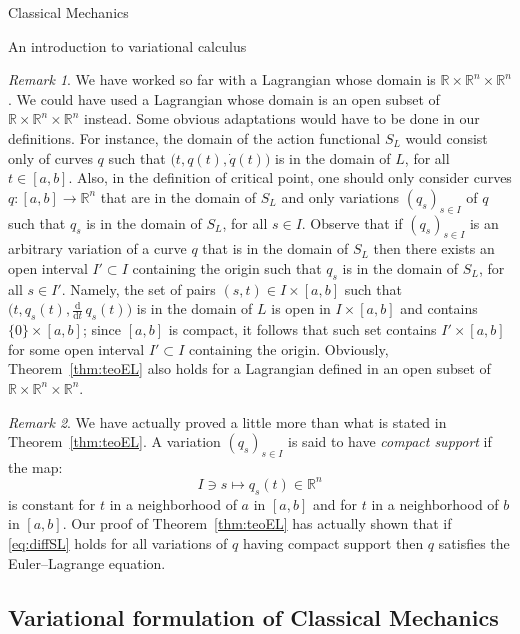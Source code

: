 \documentclass[oneside,a4paper,11pt]{amsbook}
\newcommand{\R}{\mathds R}
\newcommand{\dd}{\mathrm d}
\theoremstyle{remark}\newtheorem{exercise}{Exercise}[chapter]
\theoremstyle{plain}\newtheorem{teo}{Theorem}[section]
\theoremstyle{plain}\newtheorem{lem}[teo]{Lemma}
\theoremstyle{plain}\newtheorem{prop}[teo]{Proposition}
\theoremstyle{plain}\newtheorem{cor}[teo]{Corollary}
\theoremstyle{definition}\newtheorem{defin}[teo]{Definition}
\theoremstyle{remark}\newtheorem{rem}[teo]{Remark}
\theoremstyle{definition}\newtheorem{notation}[teo]{Notation}
\theoremstyle{definition}\newtheorem{convention}[teo]{Convention}
\theoremstyle{definition}\newtheorem{example}[teo]{Example}
\numberwithin{section}{chapter}
\numberwithin{equation}{section}
\begin{document}
\begin{chapter}{Classical Mechanics}
\begin{section}{An introduction to variational calculus}
\begin{rem}\label{thm:remdomLopen}
We have worked so far with a Lagrangian whose domain is $\R\times\R^n\times\R^n$. We could have used a Lagrangian
whose domain is an open subset of $\R\times\R^n\times\R^n$ instead. Some obvious adaptations would have to be done in our
definitions. For instance, the domain of the action functional $S_L$ would consist only of curves $q$ such that
$\big(t,q(t),\dot q(t)\big)$ is in the domain of $L$, for all $t\in[a,b]$. Also, in the definition of critical point,
one should only consider curves $q:[a,b]\to\R^n$ that are in the domain of $S_L$ and only variations
$(q_s)_{s\in I}$ of $q$ such that $q_s$ is in the domain of $S_L$, for all $s\in I$. Observe that if $(q_s)_{s\in I}$
is an arbitrary variation of a curve $q$ that is in the domain of $S_L$ then there exists an open interval $I'\subset I$
containing the origin such that $q_s$ is in the domain of $S_L$, for all $s\in I'$. Namely, the set of pairs
$(s,t)\in I\times[a,b]$ such that $\big(t,q_s(t),\frac{\dd}{\dd t}\,q_s(t)\big)$ is in the domain of $L$ is open
in $I\times[a,b]$ and contains $\{0\}\times[a,b]$; since $[a,b]$ is compact, it follows that such set contains
$I'\times[a,b]$ for some open interval $I'\subset I$ containing the origin.
Obviously, Theorem~\ref{thm:teoEL} also holds for a Lagrangian defined in an open subset
of $\R\times\R^n\times\R^n$.
\end{rem}

\begin{rem}\label{thm:remcompsupport}
We have actually proved a little more than what is stated in Theorem~\ref{thm:teoEL}.
A variation $(q_s)_{s\in I}$ is said to have {\em compact support\/} if the map:
\[I\ni s\longmapsto q_s(t)\in\R^n\]
is constant for $t$ in a neighborhood of $a$ in $[a,b]$ and for $t$ in a neighborhood of $b$ in $[a,b]$.
Our proof of Theorem~\ref{thm:teoEL} has actually shown that if \eqref{eq:diffSL} holds for all variations
of $q$ having compact support then $q$ satisfies the Euler--Lagrange equation.
\end{rem}

\subsection{Variational formulation of Classical Mechanics}
\label{sub:varClassMech}


\end{section}
\end{chapter}
\end{document}
